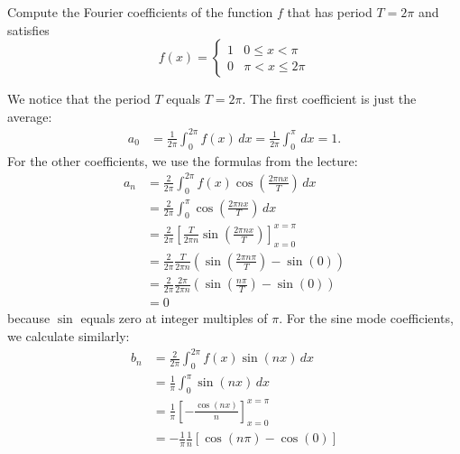 \documentclass[11pt]{article}
\begin{document}

\begin{exercise}
    Compute the Fourier coefficients of the function $f$ that has period $T = 2\pi$ and satisfies
    \[
        f(x) = \left\{\begin{array}{ll} 1 & 0 \leq x < \pi \\ 0 & \pi < x \leq 2\pi \end{array}\right.
    \]
\end{exercise}
\begin{solution}     
    We notice that the period $T$ equals $T = 2\pi$. 
    The first coefficient is just the average:
    \begin{align*}
        a_0 
        &= 
        \frac{1}{2\pi} \int_0^{2\pi} f(x) \, dx 
        = 
        \frac{1}{2\pi} \int_0^\pi \, dx  = 1
        .
    \end{align*}
    For the other coefficients, we use the formulas from the lecture:
    \begin{align*}
        a_n 
        &= 
        \frac{2}{2\pi} \int_0^{2\pi} f(x) \cos\left(\frac{2\pi n x}{T}\right) \, dx 
        \\&= 
        \frac{2}{2\pi} \int_0^\pi \cos\left(\frac{2\pi n x}{T}\right) \, dx 
        \\
        &= 
        \frac{2}{2\pi} \left[ \frac{T}{2\pi n} \sin\left(\frac{2\pi n x}{T}\right) \right]_{x=0}^{x=\pi}
        \\&= 
        \frac{2}{2\pi} \frac{T}{2\pi n} \left( \sin\left(\frac{2\pi n \pi}{T}\right) - \sin(0) \right) 
        \\&= 
        \frac{2}{2\pi} \frac{2\pi}{2\pi n} \left( \sin\left(\frac{ n \pi}{T}\right) - \sin(0) \right) 
        \\&= 
        0
    \end{align*}
    because $\sin$ equals zero at integer multiples of $\pi$.
    For the sine mode coefficients, we calculate similarly:
    \begin{align*}
        b_n 
        &= 
        \frac{2}{2\pi}
        \int_0^{2\pi} f(x) \sin(nx) \, dx 
        \\
        &= 
        \frac{1}{\pi}
        \int_0^\pi \sin(nx) \, dx 
        \\
        &= 
        \frac{1}{\pi}
        \left[-\frac{\cos(nx)}{n} \right]_{x=0}^{x=\pi} 
        \\
        &= 
        -
        \frac{1}{\pi}
        \frac{1}{n} \left[ \cos(n\pi) - \cos(0) \right] 

\end{align*}
\end{solution}
\end{document}
